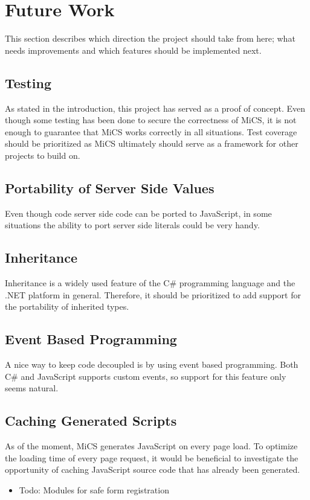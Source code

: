 
\section{Future Work}
This section describes which direction the project should take from here; what needs improvements and which features should be implemented next.

\subsection{Testing} %
\label{sub:fw_testing}
	As stated in the introduction, this project has served as a proof of concept. Even though some testing has been done to secure the correctness of MiCS, it is not enough to guarantee that MiCS works correctly in all situations. Test coverage should be prioritized as MiCS ultimately should serve as a framework for other projects to build on.

\subsection{Portability of Server Side Values} %
\label{sub:portability_of_server_side_values}
	Even though code server side code can be ported to JavaScript, in some situations the ability to port server side literals could be very handy. 

\subsection{Inheritance} %
\label{sub:fw_inheritance}
	Inheritance is a widely used feature of the C\# programming language and the .NET platform in general. Therefore, it should be prioritized to add support for the portability of inherited types.

\subsection{Event Based Programming} %
\label{sub:fw_event_based_programming}
	A nice way to keep code decoupled is by using event based programming. Both C\# and JavaScript supports custom events, so support for this feature only seems natural.

\subsection{Caching Generated Scripts} %
\label{sub:fw_script_caching}
	As of the moment, MiCS generates JavaScript on every page load. To optimize the loading time of every page request, it would be beneficial to investigate the opportunity of caching JavaScript source code that has already been generated.

\begin{itemize}
	\item Todo: Modules for safe form registration
\end{itemize}